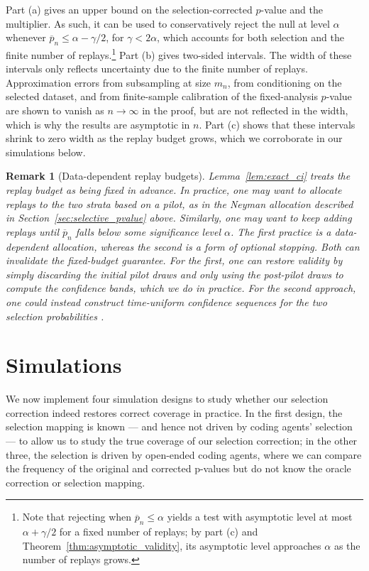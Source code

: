 \documentclass[10pt]{article}
\newtheorem{remark}{Remark}
\begin{document}
Part (a) gives an upper bound on the selection-corrected $p$-value and the multiplier. As such, it can be used to conservatively reject the null at level $\alpha$ whenever $\overline p_n\le\alpha-\gamma/2$, for $\gamma<2\alpha$, which accounts for both selection and the finite number of replays.\footnote{\label{fn:replay_test_level}Note that rejecting when $\overline p_n\le\alpha$ yields a test with asymptotic level at most $\alpha+\gamma/2$ for a fixed number of replays; by part (c) and Theorem~\ref{thm:asymptotic_validity}, its asymptotic level approaches $\alpha$ as the number of replays grows.} Part (b) gives two-sided intervals. The width of these intervals only reflects uncertainty due to the finite number of replays. Approximation errors from subsampling at size $m_n$, from conditioning on the selected dataset, and from finite-sample calibration of the fixed-analysis $p$-value are shown to vanish as $n\to\infty$ in the proof, but are not reflected in the width, which is why the results are asymptotic in $n$. Part (c) shows that these intervals shrink to zero width as the replay budget grows, which we corroborate in our simulations below.

\begin{remark}[Data-dependent replay budgets]\label{rem:adaptive_ci}
Lemma~\ref{lem:exact_ci} treats the replay budget as being fixed in advance. In practice, one may want to allocate replays to the two strata based on a pilot, as in the Neyman allocation described in  Section~\ref{sec:selective_pvalue} above. Similarly, one may want to keep adding replays until $\overline p_n$ falls below some significance level $\alpha$. The first practice is a data-dependent allocation, whereas the second is a form of optional stopping. Both can invalidate the fixed-budget guarantee. For the first, one can restore validity by simply discarding the initial pilot draws and only using the post-pilot draws to compute the confidence bands, which we do in practice. For the second approach, one could instead construct time-uniform confidence sequences for the two selection probabilities \citep{howard2021time, waudbysmith2024estimating}.
\end{remark}

\section{Simulations}\label{sec:simulation_results}

We now implement four simulation designs to study whether our selection correction indeed restores correct coverage in practice. In the first design, the selection mapping is known --- and hence not driven by coding agents' selection --- to allow us to study the true coverage of our selection correction; in the other three, the selection is driven by open-ended coding agents, where we can compare the frequency of the original and corrected p-values but do not know the oracle correction or selection mapping.
\end{document}
